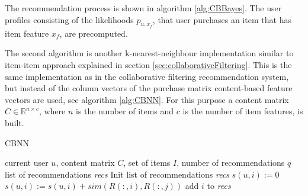 \documentclass[10pt]{reportMaster}
\begin{document}
The recommendation process is shown in algorithm \ref{alg:CBBayes}.
The user profiles consisting of the likelihoods $p_{u, x_f}$, that user purchases an item that has item feature $x_f$, are precomputed.

The second algorithm is another k-nearest-neighbour implementation similar to item-item approach explained in section \ref{sec:collaborativeFiltering}.
This is the same implementation as in the collaborative filtering recommendation system, but instead of the column vectors of the purchase matrix content-based feature vectors are used, see algorithm \ref{alg:CBNN}.
For this purpose a content matrix $C \in \mathds{R}^{n \times c}$, where $n$ is the number of items and $c$ is the number of item features, is built.


\begin{algorithm}
	\caption{CBNN}
	\label{alg:CBNN}
	\begin{algorithmic}[1]
		\Require current user $u$, content matrix $C$, set of items $I$, number of recommendations $q$
		\Ensure list of recommendations \textit{recs}
		\State Init list of recommendations \textit{recs}
			\State $s(u,i) := 0$
				\State $s(u,i) := s(u,i) + sim(R(:,i), R(:,j))$
			\EndFor
				\State add $i$ to \textit{recs}
			\EndIf
		\EndFor
	\end{algorithmic}	
\end{algorithm}

 
%
%

\end{document}
